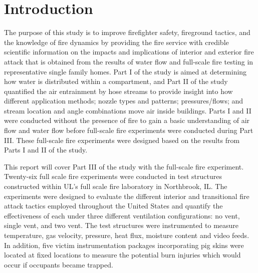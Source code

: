 \documentclass[12pt,oneside]{book}
\begin{document}


\newpage

\newpage

\chapter*{Introduction}

The purpose of this study is to improve firefighter safety, fireground tactics, and the knowledge of fire dynamics by providing the fire service with credible scientific information on the impacts and implications of interior and exterior fire attack that is obtained from the results of water flow and full-scale fire testing in representative single family homes. Part I of the study is aimed at determining how water is distributed within a compartment, and Part II of the study quantified the air entrainment by hose streams to provide insight into how different application methods; nozzle types and patterns; pressures/flows; and stream location and angle combinations move air inside buildings. Parts I and II were conducted without the presence of fire to gain a basic understanding of air flow and water flow before full-scale fire experiments were conducted during Part III. These full-scale fire experiments were designed based on the results from Parts I and II of the study. 

This report will cover Part III of the study with the full-scale fire experiment. Twenty-six full scale fire experiments were conducted in test structures constructed within UL's full scale fire laboratory in Northbrook, IL. The experiments were designed to evaluate the different interior and transitional fire attack tactics employed throughout the United States and quantify the effectiveness of each under three different ventilation configurations: no vent, single vent, and two vent. The test structures were instrumented to measure temperature, gas velocity, pressure, heat flux, moisture content and video feeds. In addition, five victim instrumentation packages incorporating pig skins were located at fixed locations to measure the potential burn injuries which would occur if occupants became trapped. 
\end{document}

